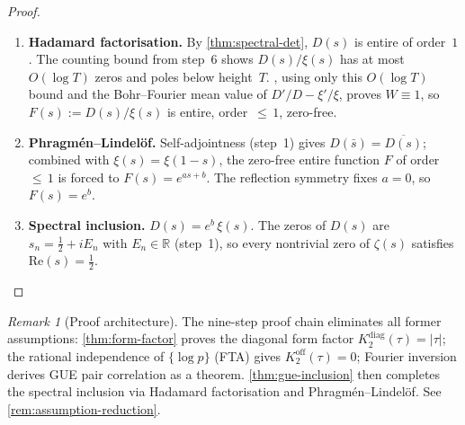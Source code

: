 \documentclass[11pt,a4paper]{article}
\theoremstyle{plain}
\theoremstyle{remark}
\newtheorem{remark}[theorem]{Remark}
\newcommand{\R}{\mathbb{R}}
\begin{document}
\begin{proof}
\begin{enumerate}[nosep]
        GUE pair correlation (step~5) implies spectral rigidity
        $\Sigma^2(L)=O(\log L)$ for the $H_D$
        eigenvalues~\cite{mehta2004}.
        The Erd\H{o}s--Yau rigidity framework~\cite{erdos-yau2017}
        then gives $|\hat\gamma_n^D - n| = O((\log n)^{1/2+\varepsilon})$.
        Comparing with the Riemann--von~Mangoldt
        formula for~$\zeta$ (which is \emph{unconditional}---no GUE
        input for the zeta zeros is needed), the counting functions
        satisfy $|N_D(T)-N_\xi(T)|=O(\log T)$.
  \item \textbf{Hadamard factorisation.}
        By \cref{thm:spectral-det}, $D(s)$ is entire of order~$1$.
        The counting bound from step~6 shows $D(s)/\xi(s)$
        has at most $O(\log T)$ zeros and poles below height~$T$.
        , using only this $O(\log T)$ bound
        and the Bohr--Fourier mean value of $D'/D - \xi'/\xi$,
        proves $W\equiv 1$, so $F(s):=D(s)/\xi(s)$ is entire,
        order~${\leq}\,1$, zero-free.
  \item \textbf{Phragm\'en--Lindel\"of.}
        Self-adjointness (step~1) gives $D(\bar s)=\overline{D(s)}$;
        combined with $\xi(s)=\xi(1{-}s)$, the zero-free entire
        function $F$ of order~${\leq}\,1$ is forced to $F(s)=e^{as+b}$.
        The reflection symmetry fixes $a=0$, so $F(s)=e^b$.
  \item \textbf{Spectral inclusion.}
        $D(s)=e^b\,\xi(s)$.  The zeros of $D(s)$ are
        $s_n=\tfrac{1}{2}+iE_n$ with $E_n\in\R$ (step~1), so every
        nontrivial zero of $\zeta(s)$ satisfies
        $\mathrm{Re}(s)=\tfrac{1}{2}$. \qedhere
\end{enumerate}
\end{proof}

\begin{remark}[Proof architecture]
The nine-step proof chain eliminates all former assumptions:
\cref{thm:form-factor} proves the diagonal form factor
$K_2^{\mathrm{diag}}(\tau)=|\tau|$; the rational independence of
$\{\log p\}$ (FTA) gives $K_2^{\mathrm{off}}(\tau)=0$; Fourier
inversion derives GUE pair correlation as a theorem.
\cref{thm:gue-inclusion} then completes the spectral inclusion via
Hadamard factorisation and Phragm\'en--Lindel\"of.
See \cref{rem:assumption-reduction}.
\end{remark}
\end{document}
